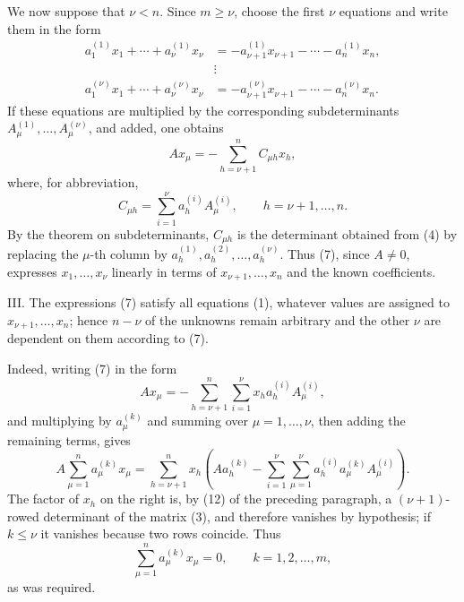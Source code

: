 \documentclass[11pt]{article}
\begin{document}
We now suppose that \(\nu<n\).  Since \(m\ge\nu\), choose the first \(\nu\) equations and write them in the form
\begin{equation}
\begin{aligned}
 a_1^{(1)}x_1+\cdots+a_\nu^{(1)}x_\nu&=-a_{\nu+1}^{(1)}x_{\nu+1}-\cdots-a_n^{(1)}x_n,\\
 &\vdots\\
 a_1^{(\nu)}x_1+\cdots+a_\nu^{(\nu)}x_\nu&=-a_{\nu+1}^{(\nu)}x_{\nu+1}-\cdots-a_n^{(\nu)}x_n.
\end{aligned}
\tag{6}
\end{equation}
If these equations are multiplied by the corresponding subdeterminants \(A_\mu^{(1)},\ldots,A_\mu^{(\nu)}\), and added, one obtains
\begin{equation}
        A x_\mu=-\sum_{h=\nu+1}^n C_{\mu h}x_h,
\tag{7}
\end{equation}
where, for abbreviation,
\begin{equation}
        C_{\mu h}=\sum_{i=1}^{\nu} a_h^{(i)}A_\mu^{(i)},\qquad
        h=\nu+1,\ldots,n.
\tag{8}
\end{equation}
By the theorem on subdeterminants, \(C_{\mu h}\) is the determinant obtained from (4) by replacing the \(\mu\)-th column by \(a_h^{(1)},a_h^{(2)},\ldots,a_h^{(\nu)}\).  Thus (7), since \(A\ne0\), expresses \(x_1,\ldots,x_\nu\) linearly in terms of \(x_{\nu+1},\ldots,x_n\) and the known coefficients.

III. The expressions (7) satisfy all equations (1), whatever values are assigned to \(x_{\nu+1},\ldots,x_n\); hence \(n-\nu\) of the unknowns remain arbitrary and the other \(\nu\) are dependent on them according to (7).

Indeed, writing (7) in the form
\begin{equation}
        A x_\mu=-\sum_{h=\nu+1}^n\sum_{i=1}^{\nu}x_h a_h^{(i)}A_\mu^{(i)},
\tag{9}
\end{equation}
and multiplying by \(a_\mu^{(k)}\) and summing over \(\mu=1,\ldots,\nu\), then adding the remaining terms, gives
\begin{equation}
        A\sum_{\mu=1}^{n}a_\mu^{(k)}x_\mu
        =\sum_{h=\nu+1}^{n}x_h\left(Aa_h^{(k)}-
          \sum_{i=1}^{\nu}\sum_{\mu=1}^{\nu}a_h^{(i)}a_\mu^{(k)}A_\mu^{(i)}\right).
\tag{11}
\end{equation}
The factor of \(x_h\) on the right is, by (12) of the preceding paragraph, a \((\nu+1)\)-rowed determinant of the matrix (3), and therefore vanishes by hypothesis; if \(k\le\nu\) it vanishes because two rows coincide.  Thus
\begin{equation}
        \sum_{\mu=1}^{n}a_\mu^{(k)}x_\mu=0,\qquad k=1,2,\ldots,m,
\tag{13}
\end{equation}
as was required.
\end{document}
